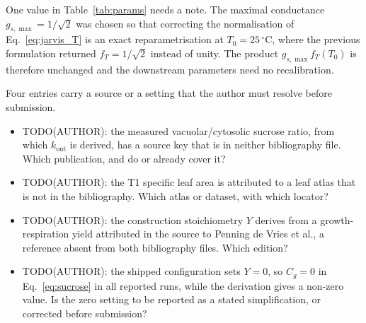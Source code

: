 One value in Table~\ref{tab:params} needs a note. The maximal conductance
$g_{s,\max} = 1/\sqrt{2}$ was chosen so that correcting the normalisation of
Eq.~\eqref{eq:jarvis_T} is an exact reparametrisation at $T_0 = 25\,^\circ$C, where
the previous formulation returned $f_T = 1/\sqrt{2}$ instead of unity. The product
$g_{s,\max} f_T(T_0)$ is therefore unchanged and the downstream parameters need no
recalibration.

Four entries carry a source or a setting that the author must resolve before
submission.

\begin{itemize}\itemsep1pt
\item TODO(AUTHOR): the measured vacuolar/cytosolic sucrose ratio, from which
      $k_{\mathrm{out}}$ is derived, has a source key that is in neither
      bibliography file. Which publication, and do \citet{Lohaus2000} or
      \citet{Nadwodnik2008} already cover it?
\item TODO(AUTHOR): the T1 specific leaf area is attributed to a leaf atlas that
      is not in the bibliography. Which atlas or dataset, with which locator?
\item TODO(AUTHOR): the construction stoichiometry $Y$ derives from a
      growth-respiration yield attributed in the source to Penning de Vries et
      al., a reference absent from both bibliography files. Which edition?
\item TODO(AUTHOR): the shipped configuration sets $Y = 0$, so $C_g = 0$ in
      Eq.~\eqref{eq:sucrose} in all reported runs, while the derivation gives a
      non-zero value. Is the zero setting to be reported as a stated
      simplification, or corrected before submission?
\end{itemize}


